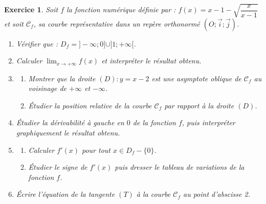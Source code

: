 \documentclass[12pt,a4paper]{article}
\newcommand{\Lim}{\displaystyle\lim}
\theoremstyle{mystyle}
\newtheorem{exo}{Exercice}
\begin{document}
\begin{multicols*}{2}
\begin{exo}

Soit $f$ la fonction numérique définie par :
$
f(x) = x - 1 - \sqrt{\dfrac{x}{x-1}}
$
et soit $\mathcal{C}_f$, sa courbe représentative dans un repère orthonormé $(O; \vec{i}; \vec{j})$.

\begin{enumerate}
    \item Vérifier que : $D_f = ] - \infty ; 0 ] \cup ] 1 ; + \infty [$.
    \item Calculer $\Lim_{x \to + \infty} f(x)$ et interpréter le résultat obtenu.
    \item 
    \begin{enumerate}
        \item Montrer que la droite $(D) : y = x - 2$ est une asymptote oblique de $\mathcal{C}_f$ au voisinage de $+ \infty$ et $- \infty$.
        \item Étudier la position relative de la courbe $\mathcal{C}_f$ par rapport à la droite $(D)$.
    \end{enumerate}
    \item Étudier la dérivabilité à gauche en $0$ de la fonction $f$, puis interpréter graphiquement le résultat obtenu.
    \item 
    \begin{enumerate}
        \item Calculer $f'(x)$ pour tout $x \in D_f - \{ 0 \}$.
        \item Étudier le signe de $f'(x)$ puis dresser le tableau de variations de la fonction $f$.
    \end{enumerate}
    \item Écrire l'équation de la tangente $(T)$ à la courbe $\mathcal{C}_f$ au point d'abscisse 2.
    

\end{enumerate}
\end{exo}
\end{multicols*}
\end{document}
